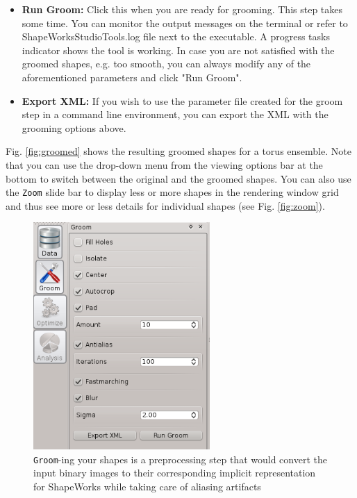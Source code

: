 \documentclass[letterpaper,12pt]{article}   %
\begin{document}
\begin{itemize}
\item \textbf{Run Groom:} Click this when you are ready for grooming. This step takes some time. You can monitor the output messages on the terminal or refer to ShapeWorksStudioTools.log file next to the executable. A progress tasks indicator shows the tool is working. In case you are not satisfied with the groomed shapes, e.g. too smooth, you can always modify any of the aforementioned parameters and click "Run Groom".

\item \textbf{Export XML:} If you wish to use the parameter file created for the groom step in a command line environment, you can export the XML with the grooming options above.

\end{itemize}

Fig. \ref{fig:groomed} shows the resulting groomed shapes for a torus ensemble. Note that you can use the drop-down menu from the viewing options bar at the bottom to switch between the original and the groomed shapes. You can also use the \texttt{Zoom} slide bar to display less or more shapes in the rendering window grid and thus see more or less details for individual shapes (see Fig. \ref{fig:zoom}).

\vspace{0.05in}
\begin{figure}[!htp]
  \begin{minipage}[c]{0.7\textwidth}
  \centering
    \includegraphics[width=0.6\textwidth]{figs/groom.png}
  \end{minipage}\hfill
  \begin{minipage}[c]{0.3\textwidth}
  \centering
    \caption{\texttt{Groom}-ing your shapes is a preprocessing step that would convert the input binary images to their corresponding implicit representation for ShapeWorks while taking care of aliasing artifacts} 
    \label{fig:groom}
  \end{minipage}
\end{figure}
\end{document}
